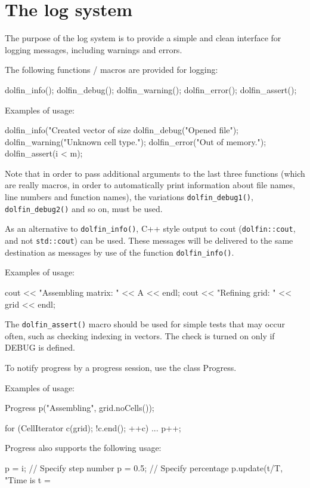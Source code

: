 \chapter{The log system}


The purpose of the log system is to provide a simple and
clean interface for logging messages, including warnings
and errors.

The following functions / macros are provided for logging:

\begin{code}
  dolfin_info();
  dolfin_debug();
  dolfin_warning();
  dolfin_error();
  dolfin_assert();
\end{code}

Examples of usage:

\begin{code}
  dolfin_info("Created vector of size %
  dolfin_debug("Opened file");
  dolfin_warning("Unknown cell type.");
  dolfin_error("Out of memory.");
  dolfin_assert(i < m);
\end{code}

Note that in order to pass additional arguments to the last
three functions (which are really macros, in order to
automatically print information about file names, line numbers
and function names), the variations \texttt{dolfin\_debug1()},
\texttt{dolfin\_debug2()} and so on, must be used.

As an alternative to \texttt{dolfin\_info()}, C++ style output to cout
(\texttt{dolfin::cout}, and not \texttt{std::cout}) can be used. These messages
will be delivered to the same destination as messages by use
of the function \texttt{dolfin\_info()}.

Examples of usage:

\begin{code}
  cout << "Assembling matrix: " << A << endl;
  cout << "Refining grid: " << grid << endl;
\end{code}

The \texttt{dolfin\_assert()} macro should be used for simple tests that
may occur often, such as checking indexing in vectors. The check
is turned on only if DEBUG is defined.

To notify progress by a progress session, use the class
Progress.

Examples of usage:

\begin{code}
  Progress p("Assembling", grid.noCells());
  
  for (CellIterator c(grid); !c.end(); ++c) {
    ...
    p++;
  }
\end{code}

Progress also supports the following usage:

\begin{code}
  p = i;    // Specify step number
  p = 0.5;  // Specify percentage
  p.update(t/T, "Time is t = %
\end{code}
